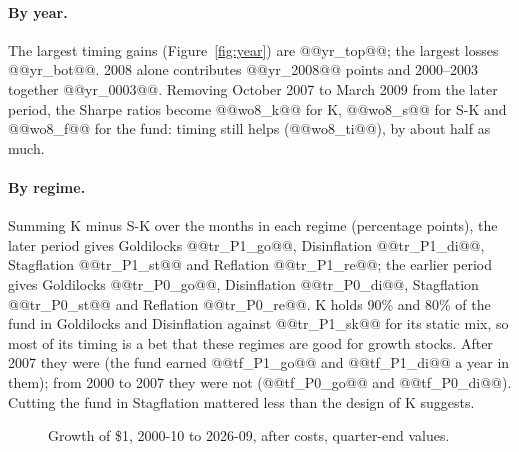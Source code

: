 \documentclass[11pt,a4paper]{article}
\begin{document}
\paragraph{By year.} The largest timing gains (Figure~\ref{fig:year}) are @@yr_top@@; the largest losses
@@yr_bot@@. 2008 alone contributes @@yr_2008@@ points and 2000--2003 together @@yr_0003@@. Removing October 2007 to
March 2009 from the later period, the Sharpe ratios become @@wo8_k@@ for K, @@wo8_s@@ for S-K and @@wo8_f@@ for the
fund: timing still helps (@@wo8_ti@@), by about half as much.

\paragraph{By regime.} Summing K minus S-K over the months in each regime (percentage points), the later period
gives Goldilocks @@tr_P1_go@@, Disinflation @@tr_P1_di@@, Stagflation @@tr_P1_st@@ and Reflation @@tr_P1_re@@; the
earlier period gives Goldilocks @@tr_P0_go@@, Disinflation @@tr_P0_di@@, Stagflation @@tr_P0_st@@ and Reflation
@@tr_P0_re@@. K holds 90\% and 80\% of the fund in Goldilocks and Disinflation against @@tr_P1_sk@@ for its static mix,
so most of its timing is a bet that these regimes are good for growth stocks. After 2007 they were (the fund
earned @@tf_P1_go@@ and @@tf_P1_di@@ a year in them); from 2000 to 2007 they were not (@@tf_P0_go@@ and
@@tf_P0_di@@). Cutting the fund in Stagflation mattered less than the design of K suggests.

\begin{figure}[htbp]
\centering
{}
\caption{Growth of \$1, 2000-10 to 2026-09, after costs, quarter-end values.}
\label{fig:wealth}
\end{figure}
\end{document}
